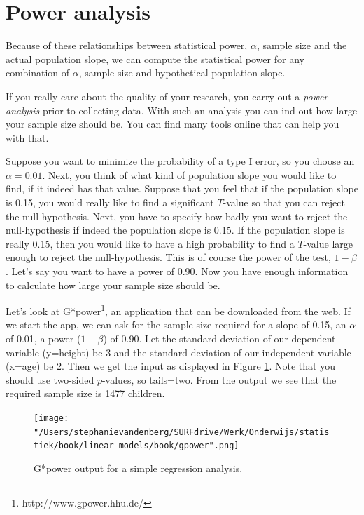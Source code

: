 \documentclass[]{report}\usepackage[]{graphicx}\usepackage[]{color}
\begin{document}
\section{Power analysis}
Because of these relationships between statistical power, $\alpha$, sample size and the actual population slope, we can compute the statistical power for any combination of $\alpha$, sample size and hypothetical population slope.


If you really care about the quality of your research, you carry out a \textit{power analysis} prior to collecting data. With such an analysis you can ind out how large your sample size should be. You can find many tools online that can help you with that.

Suppose you want to minimize the probability of a type I error, so you choose an $\alpha=0.01$. Next, you think of what kind of population slope you would like to find, if it indeed has that value. Suppose that you feel that if the population slope is 0.15, you would really like to find a significant $T$-value so that you can reject the null-hypothesis. Next, you have to specify how badly you want to reject the null-hypothesis if indeed the population slope is 0.15. If the population slope is really 0.15, then you would like to have a high probability to find a $T$-value large enough to reject the null-hypothesis. This is of course the power of the test, $1-\beta$. Let's say you want to have a power of 0.90. Now you have enough information to calculate how large your sample size should be.

Let's look at G*power\footnote{http://www.gpower.hhu.de/}, an application that can be downloaded from the web. If we start the app, we can ask for the sample size required for a slope of 0.15, an $\alpha$ of 0.01, a power ($1-\beta$) of 0.90. Let the standard deviation of our dependent variable (y=height) be 3 and the standard deviation of our independent variable (x=age) be 2. Then we get the input as displayed in Figure \ref{fig:gpower}. Note that you should use two-sided $p$-values, so tails=two. From the output we see that the required sample size is 1477 children.


\begin{figure}[h]
    \begin{center}
       \texttt{[image: "/Users/stephanievandenberg/SURFdrive/Werk/Onderwijs/statistiek/book/linear models/book/gpower".png]}
    \end{center}
    \caption{G*power output for a simple regression analysis.}
    \label{fig:gpower}
\end{figure}
\end{document}
